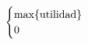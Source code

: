 \documentclass[preview]{standalone}
\begin{document}
\begin{align*}
\begin{cases} \text{max\{\text{utilidad}\}} \cr 0 \cr \end{cases}
\end{align*}
\end{document}

